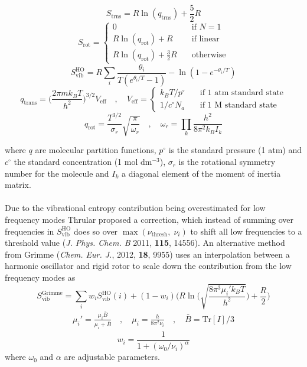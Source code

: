 \documentclass[10pt]{article}
\begin{document}
\begin{equation}
	S_\text{trns} = R  \ln(q_\text{trns}) + \frac{5}{2}R
\end{equation}
\begin{equation}
	S_\text{rot} = \begin{cases}
		0 &\quad \text{if  } N = 1 \\
		R  \ln(q_\text{rot}) + R &\quad \text{if linear} \\
		R  \ln(q_\text{rot}) + \frac{3}{2}R &\quad \text{otherwise}
	\end{cases}
\end{equation}
\begin{equation}
	S_\text{vib}^\text{HO} = R \sum_i \frac{\theta_i}{T(e^{\theta_i / T} - 1)} - \ln(1 - e^{-\theta_i / T})
\end{equation}
\begin{equation}
	q_\text{trans} = {\Big (} \frac{2\pi m k_B T}{h^2} {\Big )}^{3/2}  V_\text{eff} \quad , \quad V_\text{eff} =  \begin{cases}
		k_B T / p^{\circ} \quad&\text{if 1 atm standard state} \\
		1 / c^\circ N_a \quad&\text{if 1 M standard state} 
	\end{cases}
\end{equation}
\begin{equation}
	q_\text{rot} = \frac{T^{3/2}}{\sigma_r} \sqrt{\frac{\pi}{\omega_r}} \quad,\quad \omega_r = \prod_{k} \frac{h^2}{8 \pi^2 k_B I_k}
\end{equation}

where $q$ are molecular partition functions, $p^{\circ}$ is the standard pressure (1 atm) and $c^\circ$ the standard concentration (1 mol dm$^{-3}$), $\sigma_r$ is the rotational symmetry number for the molecule and $I_k$ a diagonal element of the moment of inertia matrix.
\\\\
Due to the vibrational entropy contribution being overestimated for low frequency modes Thrular proposed a correction, which instead of summing over frequencies in $S_\text{vib}^\text{HO}$ does so over $\max(\nu_\text{thresh},\; \nu_i)$ to shift all low frequencies to a threshold value (\emph{J. Phys. Chem. B} 2011, {\bfseries{115}}, 14556). An alternative method from Grimme (\emph{Chem. Eur. J.}, 2012, {\bfseries{18}}, 9955) uses an interpolation between a harmonic oscillator and rigid rotor to scale down the contribution from the low frequency modes as
\begin{equation}
	S_\text{vib}^\text{Grimme} = \sum_i w_i S_ \text{vib}^\text{HO}(i) + (1-w_i) {\Big (} R\ln {\Big (} \sqrt{\frac{8 \pi^3 \mu_i' k_B T}{h^2}} {\Big )} + \frac{R}{2} {\Big )}
\end{equation}
\begin{eqnarray}
	\mu_i' = \frac{\mu_i \bar{B}}{\mu_i + \bar{B}} \quad,\quad \mu_i = \frac{h}{8\pi^2 \nu_i} \quad,\quad \bar{B} = \text{Tr}[I] / 3
\end{eqnarray}
\begin{equation}
	w_i = \frac{1}{1 + (\omega_0/ \nu_i)^\alpha}
\end{equation}
where $\omega_0$ and $\alpha$ are adjustable parameters.
\end{document}
